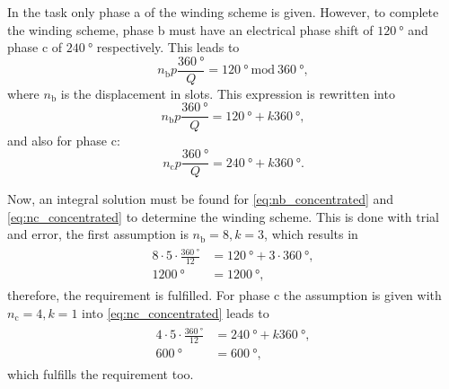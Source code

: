 \begin{solutionblock}
    In the task only phase a of the winding scheme is given. However, to complete the winding scheme, phase b must have an electrical phase shift of $\SI{120}{\degree}$ and phase c of $\SI{240}{\degree}$ respectively.
    This leads to
    \begin{equation}
        n_{\mathrm{b}} p \frac{\SI{360}{\degree}}{Q} = \SI{120}{\degree} \ \mathrm{mod} \ \SI{360}{\degree},
    \end{equation}
    where $n_{\mathrm{b}}$ is the displacement in slots. This expression is rewritten into
    \begin{equation}
        n_{\mathrm{b}} p \frac{\SI{360}{\degree}}{Q} = \SI{120}{\degree} + k \SI{360}{\degree},
        \label{eq:nb_concentrated}
    \end{equation}
    and also for phase c:
    \begin{equation}
        n_{\mathrm{c}} p \frac{\SI{360}{\degree}}{Q} = \SI{240}{\degree} + k \SI{360}{\degree}.
        \label{eq:nc_concentrated}
    \end{equation}
    
    Now, an integral solution must be found for \eqref{eq:nb_concentrated} and \eqref{eq:nc_concentrated} to determine the winding scheme.
    This is done with trial and error, the first assumption is $n_{\mathrm{b}} = 8, k = 3$, which results in
    \begin{align}
        \begin{split}
            8\cdot 5\cdot \frac{\SI{360}{\degree}}{12} &= \SI{120}{\degree}+3 \cdot \SI{360}{\degree}, \\
            \SI{1200}{\degree} &= \SI{1200}{\degree},
        \end{split}
    \end{align}
    therefore, the requirement is fulfilled. For phase c the assumption is given with $n_{\mathrm{c}} = 4, k = 1$ into \eqref{eq:nc_concentrated} leads to
    \begin{align}
        \begin{split}
            4 \cdot 5 \cdot \frac{\SI{360}{\degree}}{12} &= \SI{240}{\degree} + k \SI{360}{\degree}, \\
            \SI{600}{\degree} &= \SI{600}{\degree},
        \end{split}
    \end{align}
    which fulfills the requirement too.


\end{solutionblock}
